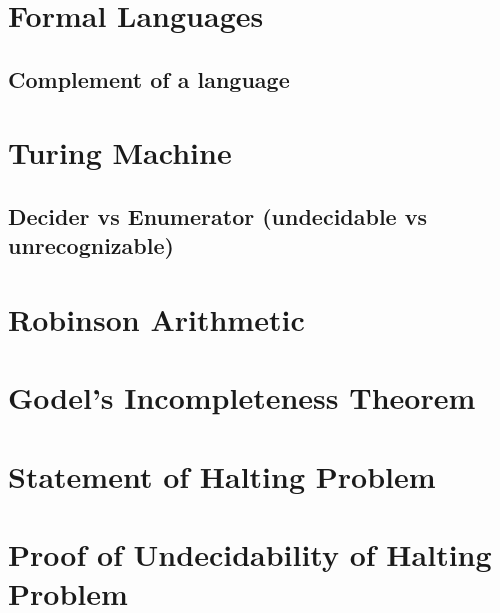 \documentclass[
11pt,notheorems,hyperref={pdfauthor=whatever}
]{beamer}
\begin{document}

\section{Formal Languages}
\begin{frame}
\end{frame}

\subsection{Complement of a language}
\begin{frame}
\end{frame}

\section{Turing Machine}
\begin{frame}
\end{frame}

\subsection{Decider vs Enumerator (undecidable vs unrecognizable)}
\begin{frame}
\end{frame}

\section{Robinson Arithmetic}
\begin{frame}
\end{frame}

\section{Godel's Incompleteness Theorem}
\begin{frame}
\end{frame}


\section{Statement of Halting Problem}
\begin{frame}
\end{frame}

\section{Proof of Undecidability of Halting Problem}
\begin{frame}
\end{frame}
\end{document}
